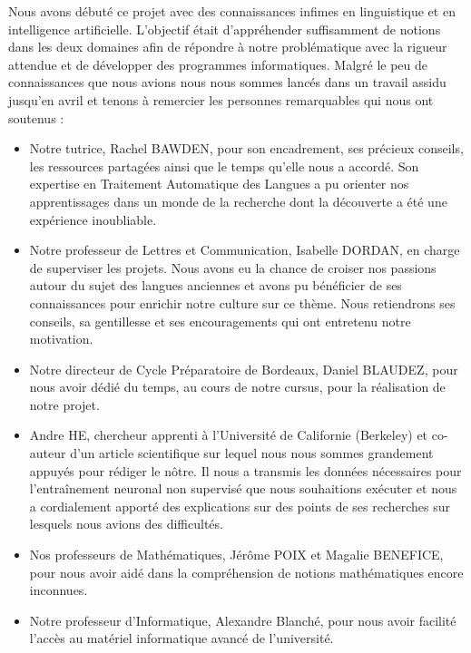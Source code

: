 \documentclass[12pt, twoside]{report}
\begin{document}
Nous avons débuté ce projet avec des connaissances infimes en linguistique et en intelligence artificielle. L'objectif était d'appréhender suffisamment de notions dans les deux domaines afin de répondre à notre problématique avec la rigueur attendue et de développer des programmes informatiques. Malgré le peu de connaissances que nous avions nous nous sommes lancés dans un travail assidu jusqu'en avril et tenons à remercier les personnes remarquables qui nous ont soutenus :
\begin{itemize}
    \item Notre tutrice, Rachel BAWDEN, pour son encadrement, ses précieux conseils, les ressources partagées ainsi que le temps qu'elle nous a accordé. Son expertise en Traitement Automatique des Langues a pu orienter nos apprentissages dans un monde de la recherche dont la découverte a été une expérience inoubliable.\\
    \item Notre professeur de Lettres et Communication, Isabelle DORDAN, en charge de superviser les projets. Nous avons eu la chance de croiser nos passions autour du sujet des langues anciennes et avons pu bénéficier de ses connaissances pour enrichir notre culture sur ce thème. Nous retiendrons ses conseils, sa gentillesse et ses encouragements qui ont entretenu notre motivation.\\
    \item Notre directeur de Cycle Préparatoire de Bordeaux, Daniel BLAUDEZ, pour nous avoir dédié du temps, au cours de notre cursus, pour la réalisation de notre projet.\\
    \item Andre HE, chercheur apprenti à l'Université de Californie (Berkeley) et co-auteur d'un article scientifique sur lequel nous nous sommes grandement appuyés pour rédiger le nôtre. Il nous a transmis les données nécessaires pour l'entraînement neuronal non supervisé que nous souhaitions exécuter et nous a cordialement apporté des explications sur des points de ses recherches sur lesquels nous avions des difficultés.\\
    \item Nos professeurs de Mathématiques, Jérôme POIX et Magalie BENEFICE, pour nous avoir aidé dans la compréhension de notions mathématiques encore inconnues.\\
    \item Notre professeur d'Informatique, Alexandre Blanché, pour nous avoir facilité l'accès au matériel informatique avancé de l'université.\\
\end{itemize}
\end{document}
